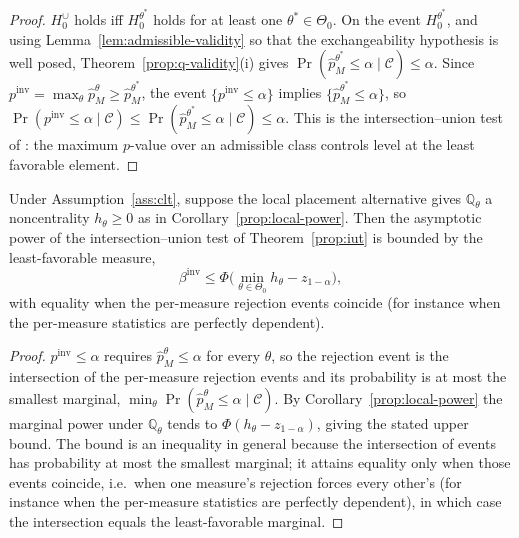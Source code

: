\documentclass[risks,article,submit,pdftex,oneauthor]{Definitions/mdpi}
\begin{document}
\begin{proof}
$H_0^{\cup}$ holds iff $H_0^{\theta^\ast}$ holds for at least one
$\theta^\ast\in\Theta_0$. On the event $H_0^{\theta^\ast}$, and using
Lemma~\ref{lem:admissible-validity} so that the exchangeability hypothesis is well
posed, Theorem~\ref{prop:q-validity}(i) gives
$\Pr(\hat p_M^{\theta^\ast}\le\alpha\mid\mathcal C)\le\alpha$. Since
$p^{\mathrm{inv}}=\max_\theta\hat p_M^\theta\ge\hat p_M^{\theta^\ast}$, the event
$\{p^{\mathrm{inv}}\le\alpha\}$ implies $\{\hat p_M^{\theta^\ast}\le\alpha\}$,
so
$\Pr(p^{\mathrm{inv}}\le\alpha\mid\mathcal C)\le\Pr(\hat
p_M^{\theta^\ast}\le\alpha\mid\mathcal C)\le\alpha$.
This is the intersection--union test of \citep{LehmannRomano2005}: the maximum
$p$-value over an admissible class controls level at the least favorable element.
\end{proof}

\begin{Corollary}
\label{cor:iut-power}
Under Assumption~\ref{ass:clt}, suppose the local placement alternative gives
$\mathbb{Q}_\theta$ a noncentrality $h_\theta\ge0$ as in
Corollary~\ref{prop:local-power}. Then the asymptotic power of the
intersection--union test of Theorem~\ref{prop:iut} is bounded by the
least-favorable measure,
\[
\beta^{\mathrm{inv}}\le\Phi\big(\min_{\theta\in\Theta_0}h_\theta-z_{1-\alpha}\big),
\]
with equality when the per-measure rejection events coincide (for instance when
the per-measure statistics are perfectly dependent).
\end{Corollary}

\begin{proof}
$p^{\mathrm{inv}}\le\alpha$ requires $\hat p_M^\theta\le\alpha$ for every
$\theta$, so the rejection event is the intersection of the per-measure rejection
events and its probability is at most the smallest marginal,
$\min_\theta\Pr(\hat p_M^\theta\le\alpha\mid\mathcal C)$. By
Corollary~\ref{prop:local-power} the marginal power under $\mathbb{Q}_\theta$
tends to $\Phi(h_\theta-z_{1-\alpha})$, giving the stated upper bound. The bound is
an inequality in general because the intersection of events has probability at most
the smallest marginal; it attains equality only when those events coincide, i.e.\
when one measure's rejection forces every other's (for instance when the
per-measure statistics are perfectly dependent), in which case the intersection
equals the least-favorable marginal.
\end{proof}
\end{document}
